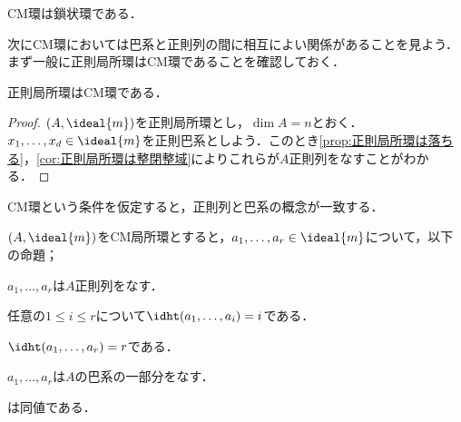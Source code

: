 \begin{cor}
	CM環は鎖状環である．
\end{cor}

次にCM環においては巴系と正則列の間に相互によい関係があることを見よう．まず一般に正則局所環はCM環であることを確認しておく．

\begin{prop}[Cohen]
	正則局所環はCM環である．
\end{prop}

\begin{proof}
	$(A,\ideal{m})$を正則局所環とし，$\dim A=n$とおく．$x_1,\dots,x_d\in\ideal{m}$を正則巴系としよう．このとき\ref{prop:正則局所環は落ちる}，\ref{cor:正則局所環は整閉整域}によりこれらが$A$正則列をなすことがわかる．
\end{proof}

CM環という条件を仮定すると，正則列と巴系の概念が一致する．

\begin{prop}\label{prop:CM局所環での正則列と巴系}
	$(A,\ideal{m})$をCM局所環とすると，$a_1,\dots,a_r\in\ideal{m}$について，以下の命題；
	\begin{sakura}
		\item $a_1,\dots,a_r$は$A$正則列をなす．
		\item 任意の$1\leq i\leq r$について$\idht (a_1,\dots,a_i)=i$である．
		\item $\idht (a_1,\dots,a_r)=r$である．
		\item $a_1,\dots,a_r$は$A$の巴系の一部分をなす．
	\end{sakura}
	は同値である．	
\end{prop}

